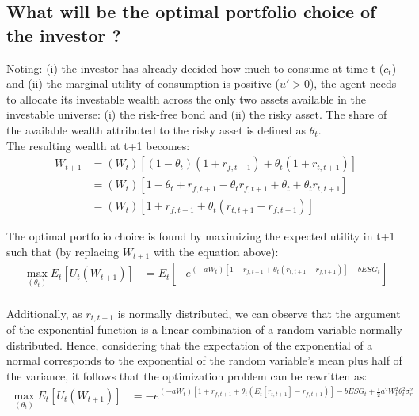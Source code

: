 \documentclass[12pt]{article}
\begin{document}
	\subsection{What will be the optimal portfolio choice of the investor ?}
	\setlength{\parindent}{0pt} Noting: (i) the investor has already decided how much to consume at time t ($c_t$) and (ii) the marginal utility of consumption is positive ($u'>0$), the agent needs to allocate its investable wealth across the only two assets available in the investable universe: (i) the risk-free bond and (ii) the risky asset. The share of the available wealth attributed to the risky asset is defined as $\theta_t$. \\
	The resulting wealth at t+1 becomes:
	\begin{align*}
		W_{t+1} &= (W_t)\left[(1-\theta_t)(1+r_{f, t+1})+ \theta_t(1+r_{t,t+1}) \right]\\
		&= (W_t) \left[1 -\theta_t + r_{f,t+1} - \theta_t r_{f,t+1} + \theta_t + \theta_t r_{t,t+1}\right]\\
		&= (W_t) \left[1 + r_{f,t+1} + \theta_t(r_{t,t+1}-r_{f, t+1}) \right]
	\end{align*} \vspace{-1.75em}
	
	\setlength{\parindent}{0pt} The optimal portfolio choice is found by maximizing the expected utility in t+1 such that (by replacing $W_{t+1}$ with the equation above):
	\begin{align*}
		\max_{(\theta_t)} E_t[U_{t}(W_{t+1})] &= E_t[-e^{(-aW_t) [1 + r_{f,t+1} + \theta_t(r_{t,t+1}-r_{f, t+1})] - bESG_t}] \\
	\end{align*}\vspace{-3.65em}
	
	Additionally, as $r_{t,t+1}$ is normally distributed, we can observe that the argument of the exponential function is a linear combination of a random variable normally distributed. Hence, considering that the expectation of the exponential of a normal corresponds to the exponential of the random variable's mean plus half of the variance, it follows that the optimization problem can be rewritten as: \vspace{-3em}\\
	
	\begin{align*}
		\max_{(\theta_t)} E_t[U_{t}(W_{t+1})] &= -e^{(-aW_t) [1 + r_{f,t+1} + \theta_t(E_{t}[r_{t,t+1}]-r_{f, t+1})] - bESG_t + \frac{1}{2}a^2W_t^2\theta_t^2\sigma_r^2} \\
	\end{align*} \vspace{-3.25em}
	
\end{document}

